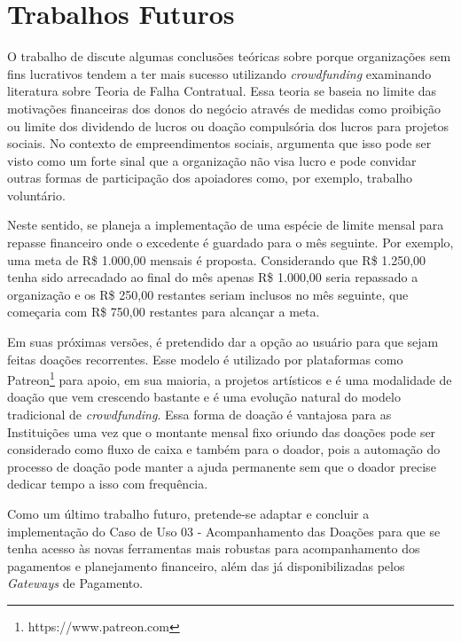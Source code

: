 
\section{Trabalhos Futuros}

O trabalho de \citeauthor{belleflamme2010} discute algumas conclusões teóricas sobre porque organizações sem fins lucrativos tendem a ter mais sucesso utilizando \emph{crowdfunding} examinando literatura sobre Teoria de Falha Contratual. Essa teoria se baseia no limite das motivações financeiras dos donos do negócio através de medidas como proibição ou limite dos dividendo de lucros ou doação compulsória dos lucros para projetos sociais. No contexto de empreendimentos sociais, \citeauthor{lehner2013crowdfunding} argumenta que isso pode ser visto como um forte sinal que a organização não visa lucro e pode convidar outras formas de participação dos apoiadores como, por exemplo, trabalho voluntário.

Neste sentido, se planeja a implementação de uma espécie de limite mensal para repasse financeiro onde o excedente é guardado para o mês seguinte. Por exemplo, uma meta de R\$ 1.000,00 mensais é proposta. Considerando que R\$ 1.250,00 tenha sido arrecadado ao final do mês apenas R\$ 1.000,00 seria repassado a organização e os R\$ 250,00 restantes seriam inclusos no mês seguinte, que começaria com R\$ 750,00 restantes para alcançar a meta.

Em suas próximas versões, é pretendido dar a opção ao usuário para que sejam feitas doações recorrentes. Esse modelo é utilizado por plataformas como Patreon\footnote{https://www.patreon.com} para apoio, em sua maioria, a projetos artísticos e é uma modalidade de doação que vem crescendo bastante e é uma evolução natural do modelo tradicional de \emph{crowdfunding}. Essa forma de doação é vantajosa para as Instituições uma vez que o montante mensal fixo oriundo das doações pode ser considerado como fluxo de caixa e também para o doador, pois a automação do processo de doação pode manter a ajuda permanente sem que o doador precise dedicar tempo a isso com frequência.

Como um último trabalho futuro, pretende-se adaptar e concluir a implementação do Caso de Uso 03 - Acompanhamento das Doações para que se tenha acesso às novas ferramentas mais robustas para acompanhamento dos pagamentos e planejamento financeiro, além das já disponibilizadas pelos \emph{Gateways} de Pagamento.